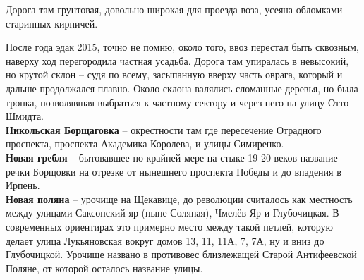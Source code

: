 Дорога там грунтовая, довольно широкая для проезда воза, усеяна обломками старинных кирпичей.

После года эдак 2015, точно не помню, около того, ввоз перестал быть сквозным, наверху ход перегородила частная усадьба. Дорога там упиралась в невысокий, но крутой склон – судя по всему, засыпанную вверху часть оврага, который и дальше продолжался плавно. Около склона валялись сломанные деревья, но была тропка, позволявшая выбраться к частному сектору и через него на улицу Отто Шмидта.\\

\textbf{Никольская Борщаговка} – окрестности там где пересечение Отрадного проспекта, проспекта Академика Королева, и улицы Симиренко.\\

\textbf{Новая гребля} – бытовавшее по крайней мере на стыке 19-20 веков название речки Борщовки на отрезке от нынешнего проспекта Победы и до впадения в Ирпень.\\

\textbf{Новая поляна} – урочище на Щекавице, до революции считалось как местность между улицами Саксонский яр (ныне Соляная), Чмелёв Яр и Глубочицкая. В современных ориентирах это примерно место между такой петлей, которую делает улица Лукьяновская вокруг домов 13, 11, 11А, 7, 7А, ну и вниз до Глубочицкой. Урочище названо в противовес близлежащей Старой Антифеевской Поляне, от которой осталось название улицы.\\


